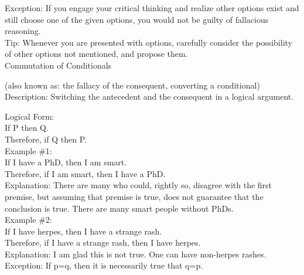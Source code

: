 \documentclass[a4paper,12pt,single,pdftex]{scrbook}
\begin{document}
    
      Exception: If you engage your critical thinking and realize other options exist and still choose one of the given options, you would not be guilty of fallacious reasoning.
    \\

    
      Tip: Whenever you are presented with options, carefully consider the possibility of other options not mentioned, and propose them.
    \\

  

Commutation of Conditionals
    
      (also known as: the fallacy of the consequent, converting a conditional)
    \\

  
    Description: Switching the antecedent and the consequent in a logical argument.

    
      Logical Form:
    \\

    
      If P then Q.
    \\

    
      Therefore, if Q then P.
    \\

    
      Example \#1:
    \\

    
      If I have a PhD, then I am smart.
    \\

    
      Therefore, if I am smart, then I have a PhD.
    \\

    
      Explanation: There are many who could, rightly so, disagree with the first premise, but assuming that premise is true, does not guarantee that the conclusion is true.  There are many smart people without PhDs.
    \\

    
      Example \#2:
    \\

    
      If I have herpes, then I have a strange rash.
    \\

    
      Therefore, if I have a strange rash, then I have herpes.
    \\

    
      Explanation: I am glad this is not true.  One can have non-herpes rashes.
    \\

    
      Exception: If p=q, then it is necessarily true that q=p.
    \\
\end{document}
